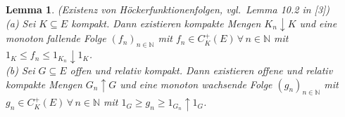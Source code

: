\documentclass[twoside]{article}
\newtheorem{lemma}[theorem]{Lemma}
\theoremstyle{definition}
\begin{document}
\begin{lemma} (Existenz von Höckerfunktionenfolgen, vgl.\ Lemma 10.2 in [3])\\
(a) Sei $K \subseteq E$ kompakt. Dann existieren kompakte Mengen $K_n \downarrow K$ und eine monoton fallende Folge $(f_n)_{n \in \mathbb{N}}$ mit $f_n \in C_K^+(E) \, \forall \, n \in \mathbb{N}$ mit $1_K \leq f_n \leq 1_{K_n} \downarrow 1_K$.\\
(b) Sei $G \subseteq E$ offen und relativ kompakt. Dann existieren offene und relativ kompakte Mengen $G_n \uparrow G$ und eine monoton wachsende Folge $(g_n)_{n \in \mathbb{N}}$ mit $g_n \in C_K^+(E) \, \forall \, n \in \mathbb{N}$ mit $1_G \geq g_n \geq 1_{G_n} \uparrow 1_G$.
\end{lemma}
\end{document}
